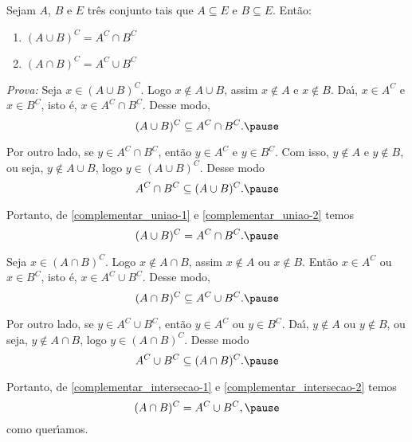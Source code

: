 \documentclass{beamer}
\begin{document}
    \begin{frame}
        \begin{proposicao}
            Sejam $A$, $B$ e $E$ tr{\^e}s conjunto \pause tais que $A\subseteq E$ \pause e $B\subseteq E$. \pause Ent{\~a}o:\pause
            \begin{enumerate}[label={\roman*})]
                \item $(A\cup B)^C = A^C\cap B^C$\pause
                \item $(A\cap B)^C = A^C\cup B^C$\pause
            \end{enumerate}
        \end{proposicao}
        \textit{Prova: }\pause 
        Seja $x \in (A\cup B)^C$. \pause Logo $x\notin A\cup B$, \pause assim $x\notin A$ \pause e $x\notin B$. \pause Da{\'\i}, $x\in A^C$ \pause e $x\in B^C$, \pause isto {\'e}, $x\in A^C\cap B^C$. \pause Desse modo, \pause
        \begin{equation}\label{complementar_uniao-1}
            (A\cup B)^C \subseteq A^C\cap B^C.\pause
        \end{equation}
    
        Por outro lado, \pause se $y \in A^C \cap B^C$, \pause ent{\~a}o $y \in A^C$ \pause e $y \in B^C$. \pause Com isso, $y \notin A$ \pause e $y \notin B$, \pause ou seja, $y\notin A\cup B$, \pause logo $y\in (A\cup B)^C$. \pause Desse modo
        \begin{equation}\label{complementar_uniao-2}
            A^C\cap B^C\subseteq(A\cup B)^C.\pause
        \end{equation}
    \end{frame}

    \begin{frame}
        Portanto, \pause de \eqref{complementar_uniao-1} e \eqref{complementar_uniao-2} temos\pause
        \[
            (A\cup B)^C = A^C\cap B^C.\pause
        \]

        Seja $x \in (A \cap B)^C$. \pause Logo $x \notin A \cap B$, \pause assim $x \notin A$ \pause ou $x \notin B$. \pause Ent\~ao $x \in A^C$ \pause ou $x \in B^C$, \pause isto {\'e}, $ x\in A^C \cup B^C$. \pause Desse modo,
        \begin{equation}\label{complementar_intersecao-1}
            (A\cap B)^C \subseteq A^C\cup B^C.\pause
        \end{equation}

        Por outro lado, \pause se $y \in A^C \cup B^C$, \pause ent{\~a}o $y \in A^C$ \pause ou $y \in B^C$. \pause Da{\'\i}, $y \notin A$ \pause ou $y \notin B$, \pause ou seja, $y \notin A \cap B$, \pause logo $y \in (A \cap B)^C$. \pause Desse modo
        \begin{equation}\label{complementar_intersecao-2}
            A^C \cup B^C \subseteq (A \cap B)^C.\pause
        \end{equation}

        Portanto, \pause de \eqref{complementar_intersecao-1} e \eqref{complementar_intersecao-2} temos\pause
        \[
            (A\cap B)^C = A^C\cup B^C,\pause
        \]
        como quer{\'\i}amos.\qedsymbol
    \end{frame}
\end{document}
